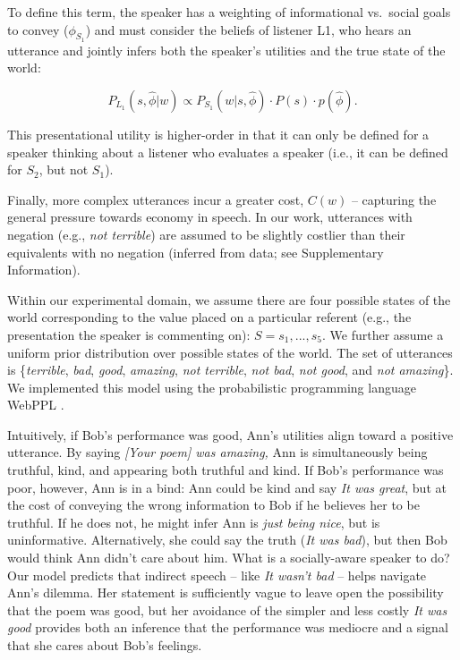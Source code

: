 \documentclass[9pt,twocolumn,twoside,lineno]{main_class_file}
\begin{document}
\noindent
To define this term, the speaker has a weighting of informational
vs.~social goals to convey (\(\phi_{S_1}\)) and must consider the
beliefs of listener L1, who hears an utterance and jointly infers both
the speaker's utilities and the true state of the world:

\begin{equation}
P_{L_1}(s, \hat{\phi} | w) \propto P_{S_1}(w | s, \hat{\phi}) \cdot P(s) \cdot p(\hat{\phi}).
\end{equation}

\noindent
This presentational utility is higher-order in that it can only be
defined for a speaker thinking about a listener who evaluates a speaker
(i.e., it can be defined for \(S_2\), but not \(S_1\)).

Finally, more complex utterances incur a greater cost, \(C(w)\) --
capturing the general pressure towards economy in speech. In our work,
utterances with negation (e.g., \emph{not terrible}) are assumed to
be slightly costlier than their equivalents with no negation (inferred
from data; see Supplementary Information).

Within our experimental domain, we assume there are four possible states
of the world corresponding to the value placed on a particular referent
(e.g., the presentation the speaker is commenting on):
\(S = {s_1,...,s_5}\). We further assume a uniform prior distribution
over possible states of the world. The set of utterances is
\{\emph{terrible}, \emph{bad}, \emph{good}, \emph{amazing}, \emph{not
terrible}, \emph{not bad}, \emph{not good}, and \emph{not amazing}\}. We
implemented this model using the probabilistic programming language
WebPPL \cite{dippl}.

Intuitively, if Bob's performance was good, Ann's utilities align toward
a positive utterance. By saying \emph{{[}Your poem{]} was amazing,}
Ann is simultaneously being truthful, kind, and appearing both truthful
and kind. If Bob's performance was poor, however, Ann is in a bind: Ann
could be kind and say \emph{It was great}, but at the cost of
conveying the wrong information to Bob if he believes her to be
truthful. If he does not, he might infer Ann is \emph{just being
nice}, but is uninformative. Alternatively, she could say the truth
(\emph{It was bad}), but then Bob would think Ann didn't care about
him. What is a socially-aware speaker to do? Our model predicts that
indirect speech -- like \emph{It wasn't bad} -- helps navigate Ann's
dilemma. Her statement is sufficiently vague to leave open the
possibility that the poem was good, but her avoidance of the simpler and
less costly \emph{It was good} provides both an inference that the
performance was mediocre and a signal that she cares about Bob's
feelings.
\end{document}
